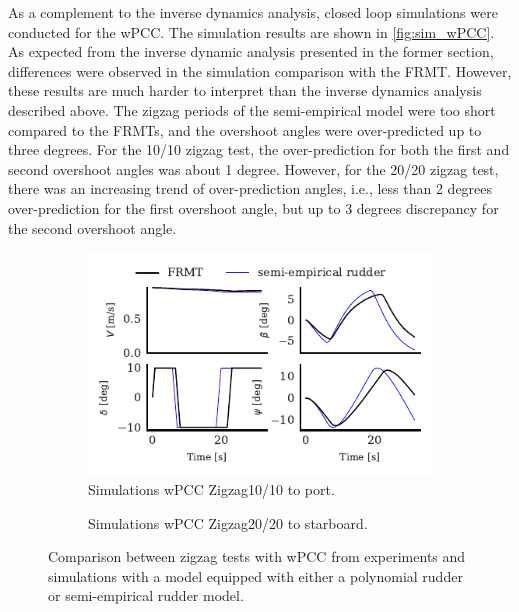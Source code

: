\noindent As a complement to the inverse dynamics analysis, closed loop simulations were conducted for the wPCC. The simulation results are shown in \autoref{fig:sim_wPCC}. As expected from the inverse dynamic analysis presented in the former section, differences were observed in the simulation comparison with the FRMT. However, these results are much harder to interpret than the inverse dynamics analysis described above.
The zigzag periods of the semi-empirical model were too short compared to the FRMTs, and the overshoot angles were over-predicted up to three degrees. For the 10/10 zigzag test, the over-prediction for both the first and second overshoot angles was about 1 degree. However, for the 20/20 zigzag test, there was an increasing trend of over-prediction angles, i.e., less than 2 degrees over-prediction for the first overshoot angle, but up to 3 degrees discrepancy for the second overshoot angle.
\begin{figure}[h]
     \centering
     \begin{subfigure}[b]{\textwidth}
         \centering
         \includegraphics{figures/results_wPCC_ID.closed loop zigzag 10_10 port.pdf}
        \caption{Simulations wPCC Zigzag10/10 to port.}
        \label{fig:sim_wPCC_10}
     \end{subfigure}
     \vfill
     \begin{subfigure}[b]{\textwidth}
        \centering
        
        \caption{Simulations wPCC Zigzag20/20 to starboard.}
        \label{fig:sim_wPCC_20}
     \end{subfigure}
        \caption{Comparison between zigzag tests with wPCC from experiments and simulations with a model equipped with either a polynomial rudder or semi-empirical rudder model.}
        \label{fig:sim_wPCC}
\end{figure}
